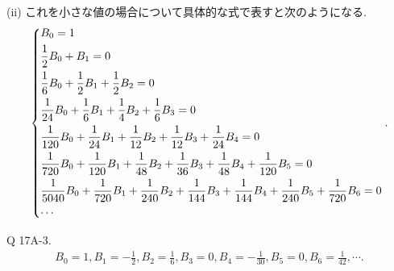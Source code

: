 \documentclass[uplatex,dvipdfmx,a4paper,11pt]{jlreq}
\theoremstyle{definition}
\begin{document}
(ii)
これを小さな値の場合について具体的な式で表すと次のようになる.
\begin{align}
  \begin{dcases}
    B_0 = 1                                                                                                                                 \\
    \frac{1}{2}B_0 + B_1 = 0                                                                                                                \\
    \frac{1}{6}B_0 + \frac{1}{2}B_1 + \frac{1}{2}B_2 = 0                                                                                    \\
    \frac{1}{24}B_0 + \frac{1}{6}B_1 + \frac{1}{4}B_2 + \frac{1}{6}B_3 = 0                                                                  \\
    \frac{1}{120}B_0 + \frac{1}{24}B_1 + \frac{1}{12}B_2 + \frac{1}{12}B_3 + \frac{1}{24}B_4 = 0                                            \\
    \frac{1}{720}B_0 + \frac{1}{120}B_1 + \frac{1}{48}B_2 + \frac{1}{36}B_3 + \frac{1}{48}B_4 + \frac{1}{120}B_5 = 0                        \\
    \frac{1}{5040}B_0 + \frac{1}{720}B_1 + \frac{1}{240}B_2 + \frac{1}{144}B_3 + \frac{1}{144}B_4 + \frac{1}{240}B_5 + \frac{1}{720}B_6 = 0 \\
    \cdots
  \end{dcases}.
\end{align}

\begin{itembox}[l]{Q 17A-3.}
  \begin{align}
    B_0 = 1, B_1 = -\frac{1}{2}, B_2 = \frac{1}{6}, B_3 = 0, B_4 = -\frac{1}{30}, B_5 = 0, B_6 = \frac{1}{42}, \cdots.
  \end{align}
\end{itembox}
\end{document}
